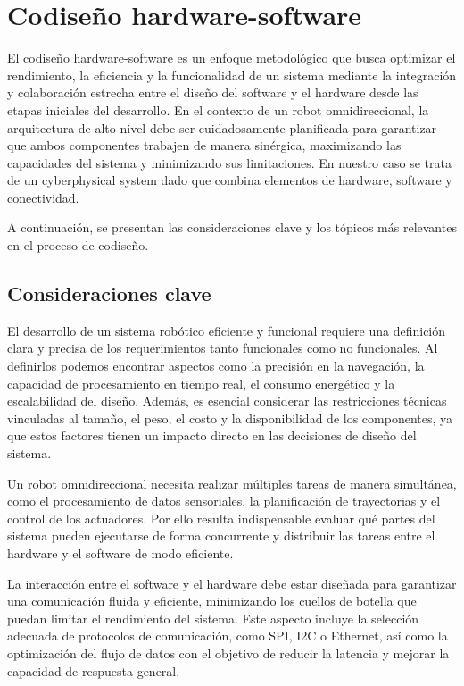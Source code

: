 \section{Codiseño hardware-software}

El codiseño hardware-software es un enfoque metodológico que busca optimizar el rendimiento, la eficiencia y la funcionalidad de un sistema mediante la integración y colaboración estrecha entre el diseño del software y el hardware desde las etapas iniciales del desarrollo. En el contexto de un robot omnidireccional, la arquitectura de alto nivel debe ser cuidadosamente planificada para garantizar que ambos componentes trabajen de manera sinérgica, maximizando las capacidades del sistema y minimizando sus limitaciones. En nuestro caso se trata de un cyberphysical system dado que combina elementos de hardware, software y conectividad.

A continuación, se presentan las consideraciones clave y los tópicos más relevantes en el proceso de codiseño.

\subsection{Consideraciones clave}
El desarrollo de un sistema robótico eficiente y funcional requiere una definición clara y precisa de los requerimientos tanto funcionales como no funcionales. Al definirlos podemos encontrar aspectos como la precisión en la navegación, la capacidad de procesamiento en tiempo real, el consumo energético y la escalabilidad del diseño. Además, es esencial considerar las restricciones técnicas vinculadas al tamaño, el peso, el costo y la disponibilidad de los componentes, ya que estos factores tienen un impacto directo en las decisiones de diseño del sistema.

Un robot omnidireccional necesita realizar múltiples tareas de manera simultánea, como el procesamiento de datos sensoriales, la planificación de trayectorias y el control de los actuadores. Por ello resulta indispensable evaluar qué partes del sistema pueden ejecutarse de forma concurrente y distribuir las tareas entre el hardware y el software de modo eficiente.

La interacción entre el software y el hardware debe estar diseñada para garantizar una comunicación fluida y eficiente, minimizando los cuellos de botella que puedan limitar el rendimiento del sistema. Este aspecto incluye la selección adecuada de protocolos de comunicación, como SPI, I2C o Ethernet, así como la optimización del flujo de datos con el objetivo de reducir la latencia y mejorar la capacidad de respuesta general. \cite{lee2017introduction}


